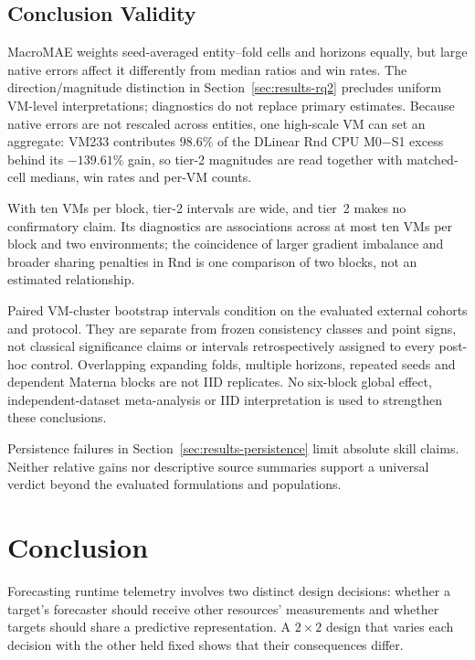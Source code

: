 \documentclass[5p,twocolumn]{elsarticle}
\begin{document}
\subsection{Conclusion Validity}
\label{sec:threats-conclusion}

MacroMAE weights seed-averaged entity--fold cells and horizons equally, but
large native errors affect it differently from median ratios and win rates.
The direction/magnitude distinction in Section~\ref{sec:results-rq2} precludes
uniform VM-level interpretations; diagnostics do not replace primary estimates.
Because native errors are not rescaled across entities, one high-scale VM
can set an aggregate: VM233 contributes $98.6\%$ of the DLinear Rnd CPU
M0$-$S1 excess behind its $-139.61\%$ gain, so tier-2 magnitudes are read
together with matched-cell medians, win rates and per-VM counts.

With ten VMs per block, tier-2 intervals are wide, and tier~2 makes no
confirmatory claim. Its diagnostics are associations across at most ten VMs
per block and two environments; the coincidence of larger gradient
imbalance and broader sharing penalties in Rnd is one comparison of two
blocks, not an estimated relationship.

Paired VM-cluster bootstrap intervals condition on the evaluated external
cohorts and protocol. They are separate from frozen consistency classes and
point signs, not classical significance claims or intervals retrospectively
assigned to every post-hoc control. Overlapping expanding folds, multiple
horizons, repeated seeds and dependent Materna blocks are not IID replicates.
No six-block global effect, independent-dataset meta-analysis or IID
interpretation is used to strengthen these conclusions.

Persistence failures in Section~\ref{sec:results-persistence} limit absolute
skill claims. Neither relative gains nor descriptive source summaries support
a universal verdict beyond the evaluated formulations and populations.

\section{Conclusion}
\label{sec:conclusion}

Forecasting runtime telemetry involves two distinct design decisions: whether
a target's forecaster should receive other resources' measurements and
whether targets should share a predictive representation. A $2\times2$
design that varies each decision with the other held fixed shows that their
consequences differ.
\end{document}
